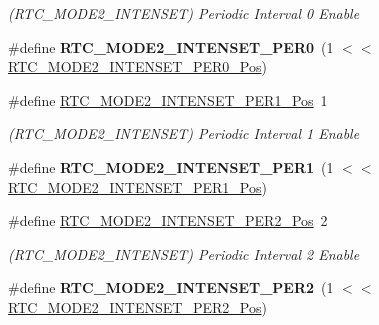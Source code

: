 \begin{DoxyCompactItemize}
\begin{DoxyCompactList}\small\item\em (R\+T\+C\+\_\+\+M\+O\+D\+E2\+\_\+\+I\+N\+T\+E\+N\+S\+E\+T) Periodic Interval 0 Enable \end{DoxyCompactList}\item 
\hypertarget{group___s_a_m_l21___r_t_c_gad090b4c53a676adbe040fbf4daf69544}{}\#define {\bfseries R\+T\+C\+\_\+\+M\+O\+D\+E2\+\_\+\+I\+N\+T\+E\+N\+S\+E\+T\+\_\+\+P\+E\+R0}~(1 $<$$<$ \hyperlink{group___s_a_m_l21___r_t_c_gadace601b886fd7b36e034d51ad54620b}{R\+T\+C\+\_\+\+M\+O\+D\+E2\+\_\+\+I\+N\+T\+E\+N\+S\+E\+T\+\_\+\+P\+E\+R0\+\_\+\+Pos})\label{group___s_a_m_l21___r_t_c_gad090b4c53a676adbe040fbf4daf69544}

\item 
\hypertarget{group___s_a_m_l21___r_t_c_gaf51eae5139e335cc95e92c3441f3092e}{}\#define \hyperlink{group___s_a_m_l21___r_t_c_gaf51eae5139e335cc95e92c3441f3092e}{R\+T\+C\+\_\+\+M\+O\+D\+E2\+\_\+\+I\+N\+T\+E\+N\+S\+E\+T\+\_\+\+P\+E\+R1\+\_\+\+Pos}~1\label{group___s_a_m_l21___r_t_c_gaf51eae5139e335cc95e92c3441f3092e}

\begin{DoxyCompactList}\small\item\em (R\+T\+C\+\_\+\+M\+O\+D\+E2\+\_\+\+I\+N\+T\+E\+N\+S\+E\+T) Periodic Interval 1 Enable \end{DoxyCompactList}\item 
\hypertarget{group___s_a_m_l21___r_t_c_gaf840e886e2bd1bc3e6a6ab99ec992250}{}\#define {\bfseries R\+T\+C\+\_\+\+M\+O\+D\+E2\+\_\+\+I\+N\+T\+E\+N\+S\+E\+T\+\_\+\+P\+E\+R1}~(1 $<$$<$ \hyperlink{group___s_a_m_l21___r_t_c_gaf51eae5139e335cc95e92c3441f3092e}{R\+T\+C\+\_\+\+M\+O\+D\+E2\+\_\+\+I\+N\+T\+E\+N\+S\+E\+T\+\_\+\+P\+E\+R1\+\_\+\+Pos})\label{group___s_a_m_l21___r_t_c_gaf840e886e2bd1bc3e6a6ab99ec992250}

\item 
\hypertarget{group___s_a_m_l21___r_t_c_ga5c1013ea9deaffa3c2d5a1212dcdbd9c}{}\#define \hyperlink{group___s_a_m_l21___r_t_c_ga5c1013ea9deaffa3c2d5a1212dcdbd9c}{R\+T\+C\+\_\+\+M\+O\+D\+E2\+\_\+\+I\+N\+T\+E\+N\+S\+E\+T\+\_\+\+P\+E\+R2\+\_\+\+Pos}~2\label{group___s_a_m_l21___r_t_c_ga5c1013ea9deaffa3c2d5a1212dcdbd9c}

\begin{DoxyCompactList}\small\item\em (R\+T\+C\+\_\+\+M\+O\+D\+E2\+\_\+\+I\+N\+T\+E\+N\+S\+E\+T) Periodic Interval 2 Enable \end{DoxyCompactList}\item 
\hypertarget{group___s_a_m_l21___r_t_c_gab1e1ba6e577dbfe6b4b02a00625ac896}{}\#define {\bfseries R\+T\+C\+\_\+\+M\+O\+D\+E2\+\_\+\+I\+N\+T\+E\+N\+S\+E\+T\+\_\+\+P\+E\+R2}~(1 $<$$<$ \hyperlink{group___s_a_m_l21___r_t_c_ga5c1013ea9deaffa3c2d5a1212dcdbd9c}{R\+T\+C\+\_\+\+M\+O\+D\+E2\+\_\+\+I\+N\+T\+E\+N\+S\+E\+T\+\_\+\+P\+E\+R2\+\_\+\+Pos})\label{group___s_a_m_l21___r_t_c_gab1e1ba6e577dbfe6b4b02a00625ac896}


\end{DoxyCompactItemize}
